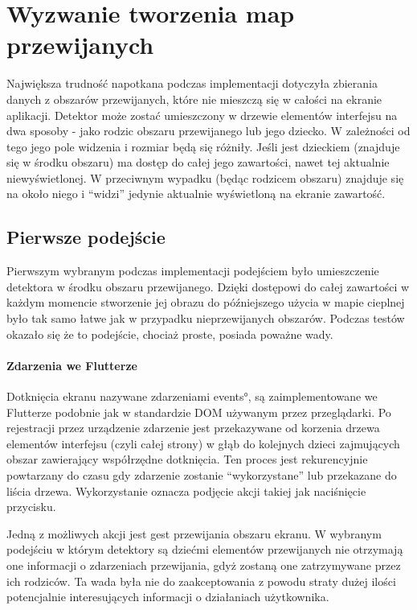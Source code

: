 \section{Wyzwanie tworzenia map przewijanych}
Największa trudność napotkana podczas implementacji dotyczyła zbierania danych z obszarów przewijanych, które nie mieszczą się w całości na ekranie aplikacji. Detektor może zostać umieszczony w drzewie elementów interfejsu na dwa sposoby - jako rodzic obszaru przewijanego lub jego dziecko. W zależności od tego jego pole widzenia i rozmiar będą się różniły. Jeśli jest dzieckiem (znajduje się w środku obszaru) ma dostęp do całej jego zawartości, nawet tej aktualnie niewyświetlonej. W przeciwnym wypadku (będąc rodzicem obszaru) znajduje się na około niego i ``widzi'' jedynie aktualnie wyświetloną na ekranie zawartość.


\subsection{Pierwsze podejście}
Pierwszym wybranym podczas implementacji podejściem było umieszczenie detektora w środku obszaru przewijanego. Dzięki dostępowi do całej zawartości w każdym momencie stworzenie jej obrazu do późniejszego użycia w mapie cieplnej było tak samo łatwe jak w przypadku nieprzewijanych obszarów. Podczas testów okazało się że to podejście, chociaż proste, posiada poważne wady.

\paragraph{Zdarzenia we Flutterze}
Dotknięcia ekranu nazywane zdarzeniami \ang{events}, są zaimplementowane we Flutterze podobnie jak w standardzie DOM używanym przez przeglądarki. Po rejestracji przez urządzenie zdarzenie jest przekazywane od korzenia drzewa elementów interfejsu (czyli całej strony) w głąb do kolejnych dzieci zajmujących obszar zawierający współrzędne dotknięcia. Ten proces jest rekurencyjnie powtarzany do czasu gdy zdarzenie zostanie ``wykorzystane'' lub przekazane do liścia drzewa. Wykorzystanie oznacza podjęcie akcji takiej jak naciśnięcie przycisku.

Jedną z możliwych akcji jest gest przewijania obszaru ekranu. W wybranym podejściu w którym detektory są dziećmi elementów przewijanych nie otrzymają one informacji o zdarzeniach przewijania, gdyż zostaną one zatrzymywane przez ich rodziców. Ta wada była nie do zaakceptowania z powodu straty dużej ilości potencjalnie interesujących informacji o działaniach użytkownika.

